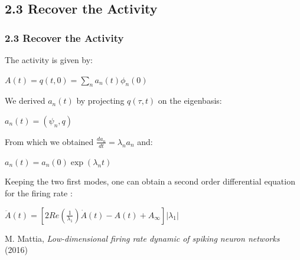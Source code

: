 \documentclass{beamer}
\begin{document}
\subsection{2.3 Recover the Activity}
\begin{frame}
\frametitle{2.3 Recover the Activity}
The activity is given by:

\vspace{0.2cm}
\hspace{3cm} $A(t)=q(t,0)=\sum_n a_n(t)\phi_n(0) $

\pause
\vspace{0.5cm}
We derived $a_n(t)$ by projecting $q(\tau,t)$ on the eigenbasis:

\vspace{0.2cm}
\hspace{3cm}$ a_n(t)=(\psi_n,q)$

\pause
\vspace{0.5cm}
From which we obtained $\frac{d a_n}{dt}= \lambda_na_n$ and:

\vspace{0.2cm}
\hspace{3cm}$a_n(t) = a_n(0)\exp(\lambda_nt)$


\pause

\vspace{0.5cm}
Keeping the two first modes, one can obtain a second order differential equation for the firing rate :

\vspace{0.2cm}
\hspace{3cm}$\ddot A(t)=[2Re(\frac{1}{\lambda_1})\dot A(t)-A(t)+A_{\infty}] |{\lambda_1}|$

\vspace{0.2cm}
\small{M. Mattia, \textit{Low-dimensional firing rate dynamic of spiking neuron networks} (2016)}



\end{frame}



\end{document}
